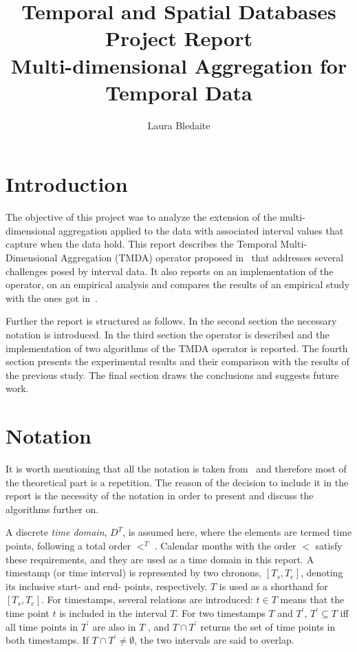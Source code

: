 \documentclass[a4paper,11pt]{article}
\begin{document}
\title{
  \textbf{\large Temporal and Spatial Databases Project Report}\\
  Multi-dimensional Aggregation for Temporal Data
}

\author{Laura Bledaite}
\maketitle

\section{Introduction}

The objective of this project was to analyze the extension of the multi-dimensional aggregation applied to the data with associated interval values that capture when the data hold. This report describes the Temporal Multi-Dimensional Aggregation (TMDA) operator proposed in~\cite{bohlen} that addresses several challenges posed by interval data. It also reports on an implementation of the operator, on an empirical analysis and compares the results of an empirical study with the ones got in~\cite{bohlen}.

Further the report is structured as follows. In the second section the necessary notation is introduced. In the third section the operator is described and the implementation of two algorithms of the TMDA operator is reported. The fourth section presents the experimental results and their comparison with the results of the previous study. The final section draws the conclusions and suggests future work.

\section{Notation}

It is worth mentioning that all the notation is taken from~\cite{bohlen} and therefore most of the theoretical part is a repetition. The reason of the decision to include it in the report is the necessity of the notation in order to present and discuss the algorithms further on.
 
A discrete \textit{time domain}, $D^{T}$, is assumed here, where the elements are termed time points, following a total order $<^{T}$ . Calendar months with the order $<$ satisfy these requirements, and they are used as a time domain in this report. A timestamp (or time interval) is represented by two chronons, $[T_s, T_e ]$, denoting its inclusive start- and end- points, respectively. $T$ is used as a shorthand for $[T_s, T_e ]$. For timestamps, several relations are introduced: $t \in T$ means that the time point $t$ is included in the interval $T$. For two timestamps $T$ and $T^{'}$, $T^{'} \subseteq T$ iff all time points in $T^{'}$ are also in $T$ , and $T \cap T^{'}$ returns the set of time points in both timestamps. If $T \cap T^{'} \neq \emptyset$, the two intervals are said to overlap.
\end{document}
